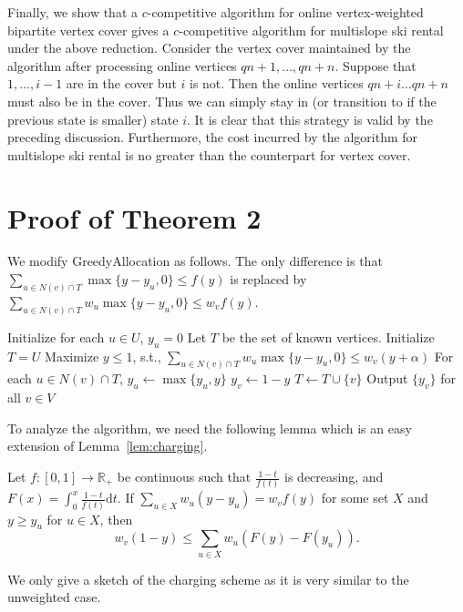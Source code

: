 Finally, we show that a $c$-competitive algorithm for online vertex-weighted bipartite vertex cover gives a $c$-competitive algorithm for multislope ski rental under the above reduction. Consider the vertex cover maintained by the algorithm after processing online vertices $qn+1,\ldots,qn+n$. Suppose that $1,\ldots,i-1$ are in the cover but $i$ is not. Then the online vertices  $qn+i\ldots qn+n$ must also be in the cover. Thus we can simply stay in (or transition to if the previous state is smaller) state $i$. It is clear that this strategy is valid by the preceding discussion. Furthermore, the cost incurred by the algorithm for multislope ski rental is no greater than the counterpart for vertex cover.

\section{Proof of Theorem 2}
We modify GreedyAllocation as follows. The only difference is that $\sum_{u\in N(v)\cap T} \max\{y-y_u,0\} \leq f(y)$ is replaced by $\sum_{u\in N(v)\cap T} w_u\max\{y-y_u,0\} \leq w_vf(y)$.

\begin{algorithm}[h!]
\SetAlgoLined
\caption{$GreedyAllocation$ with allocation function $y+\alpha$}
\label{alg:general greedy}
Initialize for each $u\in U$, $y_u = 0$\;
Let $T$ be the set of known vertices. Initialize $T=U$\;
{
Maximize $y\le 1$, s.t., $\sum_{u\in N(v)\cap T} w_u\max\{y-y_u,0\} \leq w_v(y+\alpha)$\;
For each $u\in N(v)\cap T$, $y_u \leftarrow \max\{ y_u, y\}$\;
$y_v \leftarrow 1-y$\;
$T\leftarrow T\cup \{v\}$\;
}
Output $\{y_v\}$ for all $v\in V$\;
\end{algorithm}

To analyze the algorithm, we need the following lemma which is an easy extension of Lemma~\ref{lem:charging}.

\begin{lemma}
\label{lem:weightedcharging}
Let $f:[0,1]\longrightarrow\mathbb{R}_+$ be continuous such that $\frac{1-t}{f(t)}$ is decreasing, and $F(x)=\int_0^x  \frac{1-t}{f(t)}\mathrm{d}t$. If $\sum_{u\in X} w_u(y-y_u)= w_vf(y)$ for some set $X$ and $y\geq y_u$ for $u\in X$, then
$$w_v(1-y)\leq \sum_{u\in X} w_u\left(F(y)-F(y_u)\right).$$
\end{lemma}

We only give a sketch of the charging scheme as it is very similar to the unweighted case.

